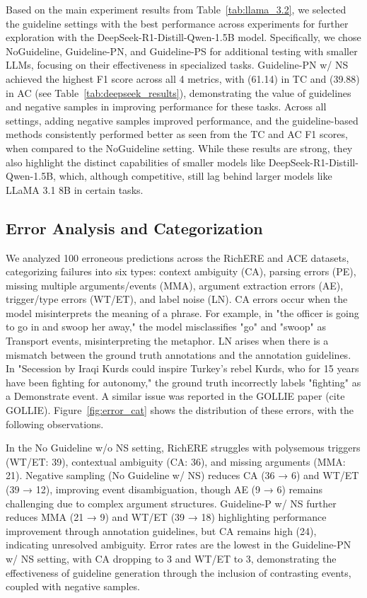 Based on the main experiment results from Table~\ref{tab:llama_3.2}, we selected the guideline settings with the best performance across experiments for further exploration with the DeepSeek-R1-Distill-Qwen-1.5B model. Specifically, we chose NoGuideline, Guideline-PN, and Guideline-PS for additional testing with smaller LLMs, focusing on their effectiveness in specialized tasks. Guideline-PN w/ NS achieved the highest F1 score across all 4 metrics, with (61.14) in TC and (39.88) in AC (see Table~\ref{tab:deepseek_results}), demonstrating the value of guidelines and negative samples in improving performance for these tasks. Across all settings, adding negative samples improved performance, and the guideline-based methods consistently performed better as seen from the TC and AC F1 scores, when compared to the NoGuideline setting. While these results are strong, they also highlight the distinct capabilities of smaller models like DeepSeek-R1-Distill-Qwen-1.5B, which, although competitive, still lag behind larger models like LLaMA 3.1 8B in certain tasks.

\subsection{Error Analysis and Categorization}

We analyzed 100 erroneous predictions across the RichERE and ACE datasets, categorizing failures into six types: context ambiguity (CA), parsing errors (PE), missing multiple arguments/events (MMA), argument extraction errors (AE), trigger/type errors (WT/ET), and label noise (LN). CA errors occur when the model misinterprets the meaning of a phrase. For example, in "the officer is going to go in and swoop her away," the model misclassifies "go" and "swoop" as Transport events, misinterpreting the metaphor. LN arises when there is a mismatch between the ground truth annotations and the annotation guidelines. In "Secession by Iraqi Kurds could inspire Turkey's rebel Kurds, who for 15 years have been fighting for autonomy," the ground truth incorrectly labels "fighting" as a Demonstrate event. A similar issue was reported in the GOLLIE paper (cite GOLLIE). Figure~\ref{fig:error_cat} shows the distribution of these errors, with the following observations.

In the No Guideline w/o NS setting, RichERE struggles with polysemous triggers (WT/ET: 39), contextual ambiguity (CA: 36), and missing arguments (MMA: 21). Negative sampling (No Guideline w/ NS) reduces CA (36 → 6) and WT/ET (39 → 12), improving event disambiguation, though AE (9 → 6) remains challenging due to complex argument structures. Guideline-P w/ NS further reduces MMA (21 → 9) and WT/ET (39 → 18) highlighting performance improvement through annotation guidelines, but CA remains high (24), indicating unresolved ambiguity. Error rates are the lowest in the Guideline-PN w/ NS setting, with CA dropping to 3 and WT/ET to 3, demonstrating the effectiveness of guideline generation through the inclusion of contrasting events, coupled with negative samples.

